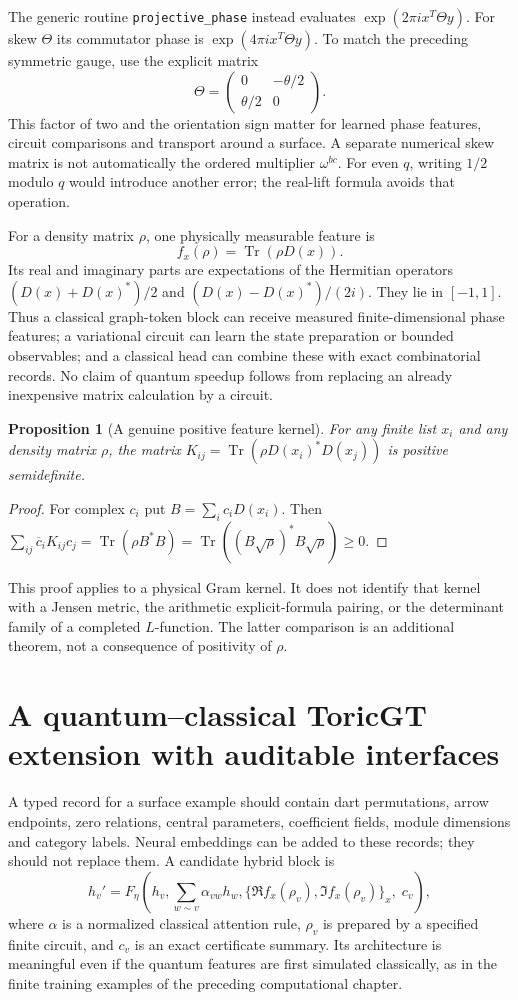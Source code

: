 \documentclass[11pt,oneside,openany]{book}
\newtheorem{proposition}[theorem]{Proposition}
\theoremstyle{definition}\newtheorem{definition}[theorem]{Definition}
\theoremstyle{remark}\newtheorem{remark}[theorem]{Remark}
\begin{document}
The generic routine \texttt{projective\_phase} instead evaluates
$\exp(2\pi i x^T\Theta y)$. For skew $\Theta$ its commutator phase
is $\exp(4\pi i x^T\Theta y)$. To match the preceding symmetric gauge,
use the explicit matrix
\[
 \Theta=\begin{pmatrix}0&-\theta/2\\\theta/2&0\end{pmatrix}.
\]
This factor of two and the orientation sign matter for learned phase
features, circuit comparisons and transport around a surface. A separate
numerical skew matrix is not automatically the ordered multiplier
$\omega^{bc}$. For even $q$, writing $1/2$ modulo $q$ would introduce
another error; the real-lift formula avoids that operation.

For a density matrix $\rho$, one physically measurable feature is
\[
 f_x(\rho)=\operatorname{Tr}(\rho D(x)).
\]
Its real and imaginary parts are expectations of the Hermitian operators
$(D(x)+D(x)^*)/2$ and $(D(x)-D(x)^*)/(2i)$. They lie in $[-1,1]$.
Thus a classical graph-token block can receive measured finite-dimensional
phase features; a variational circuit can learn the state preparation or
bounded observables; and a classical head can combine these with exact
combinatorial records. No claim of quantum speedup follows from replacing
an already inexpensive matrix calculation by a circuit.

\begin{proposition}[A genuine positive feature kernel]\label{tg:kernel}
For any finite list $x_i$ and any density matrix $\rho$, the matrix
$K_{ij}=\operatorname{Tr}(\rho D(x_i)^*D(x_j))$ is positive semidefinite.
\end{proposition}
\begin{proof}
For complex $c_i$ put $B=\sum_i c_iD(x_i)$. Then
$\sum_{ij}\overline c_iK_{ij}c_j=\operatorname{Tr}(\rho B^*B)
=\operatorname{Tr}((B\sqrt\rho)^*B\sqrt\rho)\geq0$.
\end{proof}
This proof applies to a physical Gram kernel. It does not identify that
kernel with a Jensen metric, the arithmetic explicit-formula pairing, or
the determinant family of a completed $L$-function. The latter comparison
is an additional theorem, not a consequence of positivity of $\rho$.

\section{A quantum--classical ToricGT extension with auditable interfaces}
A typed record for a surface example should contain dart permutations,
arrow endpoints, zero relations, central parameters, coefficient fields,
module dimensions and category labels. Neural embeddings can be added to
these records; they should not replace them. A candidate hybrid block is
\[
 h_v' = F_\eta\!\left(h_v,\sum_{w\sim v}\alpha_{vw}h_w,
      \{\Re f_x(\rho_v),\Im f_x(\rho_v)\}_x,\;c_v\right),
\]
where $\alpha$ is a normalized classical attention rule, $\rho_v$ is
prepared by a specified finite circuit, and $c_v$ is an exact certificate
summary. Its architecture is meaningful even if the quantum features are
first simulated classically, as in the finite training examples of the
preceding computational chapter.
\end{document}

